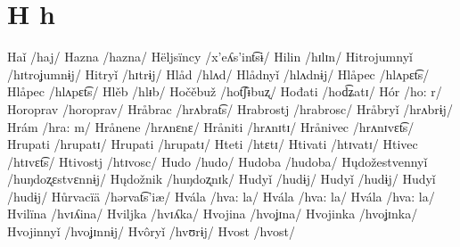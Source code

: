 \chapter{H h}

Haǐ /haj/ 
Hazna /hazna/ 
Hëljsïncy /x’eʎs’int͡sɨ/ 
Hilin /hɪlɪn/ 
Hitrojumnyǐ /hɪtroʝumnɨj/ 
Hitryǐ /hɪtrɨj/ 
Hlåd /hlʌd/ 
Hlådnyǐ /hlʌdnɨj/ 
Hlåpec /hlʌpɛt͡s/ 
Hlåpec /hlʌpɛt͡s/ 
Hlěb /hlᵻb/ 
Hočěbuž /hot͡ʃᵻbuʐ/ 
Hođati /hod͡ʑatɪ/ 
Hór /ho: r/ 
Horoprav /horoprav/ 
Hråbrac /hrʌbrat͡s/ 
Hrabrostj /hrabrosc/ 
Hråbryǐ /hrʌbrɨj/ 
Hrám /hra: m/ 
Hrånene /hrʌnɛnɛ/ 
Hråniti /hrʌnɪtɪ/ 
Hrånivec /hrʌnɪvɛt͡s/ 
Hrupati /hrupatɪ/ 
Hrupati /hrupatɪ/ 
Hteti /htɛtɪ/ 
Htivati /htɪvatɪ/ 
Htivec /htɪvɛt͡s/ 
Htivostj /htɪvosc/ 
Hudo /hudo/ 
Hudoba /hudoba/ 
Hųdožestvennyǐ /huŋdoʐɛstvɛnnɨj/ 
Hųdožnik /huŋdoʐnɪk/ 
Hudyǐ /hudɨj/ 
Hudyǐ /hudɨj/ 
Hudyǐ /hudɨj/ 
Hůrvacïä /hərvat͡s’iæ/ 
Hvála /hva: la/ 
Hvála /hva: la/ 
Hvála /hva: la/ 
Hvilïna /hvɪʎina/ 
Hviljka /hvɪʎka/ 
Hvojina /hvoʝɪna/ 
Hvojinka /hvoʝɪnka/ 
Hvojinnyǐ /hvoʝɪnnɨj/ 
Hvôryǐ /hvʊrɨj/ 
Hvost /hvost/